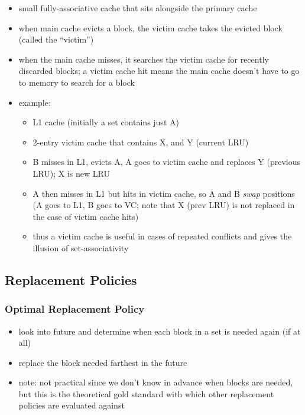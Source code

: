 \documentclass[12pt]{extarticle}
\begin{document}
	\begin{itemize}
		\item small fully-associative cache that sits alongside the primary cache
		\item when main cache evicts a block, the victim cache takes the evicted block (called the ``victim'')
		\item when the main cache misses, it searches the victim cache for recently discarded blocks; a victim cache hit 
		means the main cache doesn't have to go to memory to search for a block

		\item example:
		\begin{itemize}
			\item L1 cache (initially a set contains just A)
			\item 2-entry victim cache that contains X, and Y (current LRU)
			\item B misses in L1, evicts A, A goes to victim cache and replaces Y (previous LRU); X is new LRU
			\item A then misses in L1 but hits in victim cache, so A and B \textit{swap} positions (A goes to L1, B goes to VC; 
			note that X (prev LRU) is not replaced in the case of victim cache hits)
			\item thus a victim cache is useful in cases of repeated conflicts and gives the illusion of set-associativity
		\end{itemize}
	\end{itemize}

	\subsection{Replacement Policies}

	\subsubsection{Optimal Replacement Policy}

	\begin{itemize}
		\item look into future and determine when each block in a set is needed again (if at all)
		\item replace the block needed farthest in the future
		\item note: not practical since we don't know in advance when blocks are needed, but this is the theoretical gold 
		standard with which other replacement policies are evaluated against
	\end{itemize}
\end{document}
